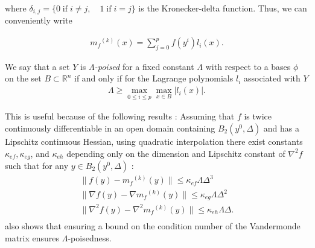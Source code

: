 \documentclass{article}
\theoremstyle{case}
\newcommand{\modelk}{{{m}_f}^{(k)}}
\begin{document}
where $\delta_{i,j} = \{0 \;\text{if}\; i\ne j,\quad 1 \;\text{if} \; i = j \}$ is the Kronecker-delta function.
Thus, we can conveniently write

\begin{align}
\label{reg}
\modelk(x) = \sum^p_{j=0}f(y^i)l_i(x).
\end{align}


We say that a set $Y$ is \emph{$\Lambda$-poised} for a fixed constant $\Lambda$ with respect to a bases $\phi$ on the set 
$B \subset \mathbb R^n$ if and only if for the Lagrange polynomials $l_i$ associated with $Y$
\begin{align}
\Lambda \ge \max_{0\le i\le p}\max_{x\in B}|l_i(x)|.
\end{align}


This is useful because of the following results \cite{DUMMY:intro_book}:
Assuming that $f$ is twice continuously differentiable in an open domain containing $B_2(y^0, \Delta)$ and has a Lipschitz continuous Hessian, using quadratic interpolation there exist constants $\kappa_{ef}, \kappa_{eg}$, and $\kappa_{eh}$ depending only on the dimension and Lipschitz constant of $\nabla^2 f$ such that for any $y \in B_2(y^0, \Delta)$ :
\begin{align}
 \label{fully_quadratic}
 \|f(y) - \modelk(y)\| \le \kappa_{ef} \Lambda \Delta^3 \\
 \|\nabla f(y) - \nabla \modelk(y)\| \le \kappa_{eg} \Lambda \Delta^2 \\
 \|\nabla^2 f(y) - \nabla^2 \modelk(y)\| \le \kappa_{eh}\Lambda \Delta .\\
\end{align}
\cite{DUMMY:intro_book} also shows that ensuring a bound on the condition number of the Vandermonde matrix ensures $\Lambda$-poisedness.
\end{document}
